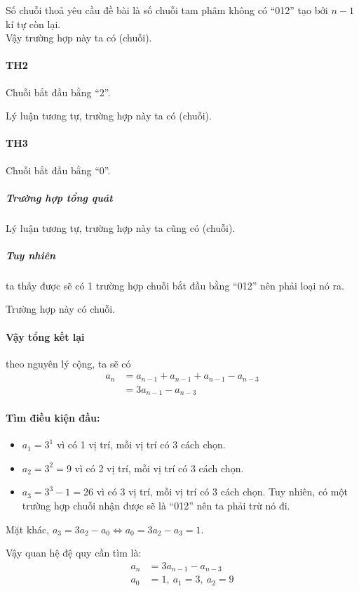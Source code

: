 \documentclass[main.tex]{subfiles}
\begin{document}
Số chuỗi thoả yêu cầu đề bài là số chuỗi tam phâm không có ``012'' tạo bởi $n-1$ kí tự còn lại. \\
Vậy trường hợp này ta có  (chuỗi).\\

\paragraph{TH2} 
Chuỗi bắt đầu bằng ``2''.\\


Lý luận tương tự, trường hợp này ta có  (chuỗi).\\

\paragraph{TH3} 
Chuỗi bắt đầu bằng ``0''.\\
\subparagraph{Trường hợp tổng quát}

Lý luận tương tự, trường hợp này ta cũng có  (chuỗi).

\subparagraph{Tuy nhiên} ta thấy được sẽ có 1 trường hợp chuỗi bắt đầu bằng ``012'' nên phải loại nó ra.
Trường hợp này có  chuỗi.

\paragraph{Vậy tổng kết lại} theo nguyên lý cộng, ta sẽ có
\begin{align*}
a_n &= a_{n-1} + a_{n-1} + a_{n-1} - a_{n-3}\\
&= 3a_{n-1} - a_{n-3}
\end{align*}

\paragraph*{Tìm điều kiện đầu:}
\begin{itemize}
    \item $a_1 = 3^1$ vì có 1 vị trí, mỗi vị trí có 3 cách chọn.
    \item $a_2 = 3^2 = 9$ vì có 2 vị trí, mỗi vị trí có 3 cách chọn.
    \item $a_3 = 3^3-1 = 26$ vì có 3 vị trí, mỗi vị trí có 3 cách chọn. Tuy nhiên, có một trường hợp chuỗi nhận được sẽ là ``012'' nên ta phải trừ nó đi.
\end{itemize}
Mặt khác, $a_3 = 3a_2 - a_0 \Leftrightarrow a_0 = 3a_2 - a_3 = 1$.

Vậy quan hệ đệ quy cần tìm là:
\begin{align*}
a_n &= 3a_{n-1} - a_{n-3} \\
a_0 &= 1,\ a_1 = 3,\ a_2 = 9
\end{align*}
\end{document}
